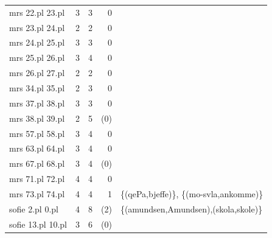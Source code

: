 \documentclass[12pt,a4paper,oneside,draft]{report}
\begin{document}
\begin{table}[htb]
\begin{center}
\begin{tabular}{lrrrl}
 mrs 22.pl 23.pl    &      3  &      3  &         0  &                                                \\
 mrs 23.pl 24.pl    &      2  &      2  &         0  &                                                \\
 mrs 24.pl 25.pl    &      3  &      3  &         0  &                                                \\
 mrs 25.pl 26.pl    &      3  &      4  &         0  &                                                \\
 mrs 26.pl 27.pl    &      2  &      2  &         0  &                                                \\
 mrs 34.pl 35.pl    &      2  &      3  &         0  &                                                \\
 mrs 37.pl 38.pl    &      3  &      3  &         0  &                                                \\
 mrs 38.pl 39.pl    &      2  &      5  &       (0)  &                                                \\
 mrs 57.pl 58.pl    &      3  &      4  &         0  &                                                \\
 mrs 63.pl 64.pl    &      3  &      4  &         0  &                                                \\
 mrs 67.pl 68.pl    &      3  &      4  &       (0)  &                                                \\
 mrs 71.pl 72.pl    &      4  &      4  &         0  &                                                \\
 mrs 73.pl 74.pl    &      4  &      4  &         1  &  \{(qePa,bjeffe)\}, \{(mo-svla,ankomme)\}      \\
 sofie 2.pl 0.pl    &      4  &      8  &       (2)  &  \{(amundsen,Amundsen),(skola,skole)\}         \\
 sofie 13.pl 10.pl  &      3  &      6  &       (0)  &                                                \\
\end{tabular}
\end{center}
\end{table}
\end{document}
